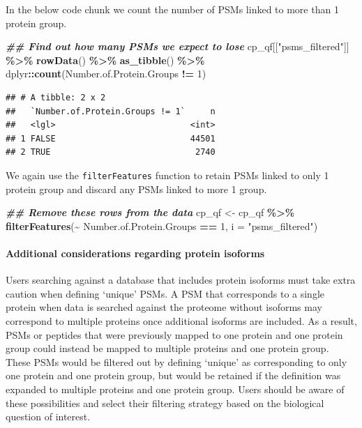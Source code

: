 \documentclass[9pt,a4paper,]{extarticle}
\newenvironment{Shaded}{\begin{snugshade}}{\end{snugshade}}
\newcommand{\AttributeTok}[1]{\textcolor[rgb]{0.13,0.29,0.53}{#1}}
\newcommand{\DecValTok}[1]{\textcolor[rgb]{0.00,0.00,0.81}{#1}}
\newcommand{\DocumentationTok}[1]{\textcolor[rgb]{0.56,0.35,0.01}{\textbf{\textit{#1}}}}
\newcommand{\FunctionTok}[1]{\textcolor[rgb]{0.13,0.29,0.53}{\textbf{#1}}}
\newcommand{\NormalTok}[1]{#1}
\newcommand{\OtherTok}[1]{\textcolor[rgb]{0.56,0.35,0.01}{#1}}
\newcommand{\SpecialCharTok}[1]{\textcolor[rgb]{0.81,0.36,0.00}{\textbf{#1}}}
\newcommand{\StringTok}[1]{\textcolor[rgb]{0.31,0.60,0.02}{#1}}
\begin{document}
In the below code chunk we count the number of PSMs linked to more than 1
protein group.

\begin{Shaded}
\begin{Highlighting}[]
\DocumentationTok{\#\# Find out how many PSMs we expect to lose}
\NormalTok{cp\_qf[[}\StringTok{"psms\_filtered"}\NormalTok{]] }\SpecialCharTok{\%\textgreater{}\%} 
  \FunctionTok{rowData}\NormalTok{() }\SpecialCharTok{\%\textgreater{}\%} 
  \FunctionTok{as\_tibble}\NormalTok{() }\SpecialCharTok{\%\textgreater{}\%} 
\NormalTok{  dplyr}\SpecialCharTok{::}\FunctionTok{count}\NormalTok{(Number.of.Protein.Groups }\SpecialCharTok{!=} \DecValTok{1}\NormalTok{)}
\end{Highlighting}
\end{Shaded}

\begin{verbatim}
## # A tibble: 2 x 2
##   `Number.of.Protein.Groups != 1`     n
##   <lgl>                           <int>
## 1 FALSE                           44501
## 2 TRUE                             2740
\end{verbatim}

We again use the \texttt{filterFeatures} function to retain PSMs linked to only
1 protein group and discard any PSMs linked to more 1 group.

\begin{Shaded}
\begin{Highlighting}[]
\DocumentationTok{\#\# Remove these rows from the data}
\NormalTok{cp\_qf }\OtherTok{\textless{}{-}}\NormalTok{ cp\_qf }\SpecialCharTok{\%\textgreater{}\%}
  \FunctionTok{filterFeatures}\NormalTok{(}\SpecialCharTok{\textasciitilde{}}\NormalTok{ Number.of.Protein.Groups }\SpecialCharTok{==} \DecValTok{1}\NormalTok{, }
                 \AttributeTok{i =} \StringTok{"psms\_filtered"}\NormalTok{)}
\end{Highlighting}
\end{Shaded}

\paragraph{Additional considerations regarding protein isoforms}\label{additional-considerations-regarding-protein-isoforms}

Users searching against a database that includes protein isoforms must take
extra caution when defining `unique' PSMs. A PSM that corresponds to a single
protein when data is searched against the proteome without isoforms may
correspond to multiple proteins once additional isoforms are included. As a
result, PSMs or peptides that were previously mapped to one protein and one
protein group could instead be mapped to multiple proteins and one protein group.
These PSMs would be filtered out by defining `unique' as corresponding to only
one protein and one protein group, but would be retained if the definition was
expanded to multiple proteins and one protein group. Users should be aware of
these possibilities and select their filtering strategy based on the biological
question of interest.
\end{document}
